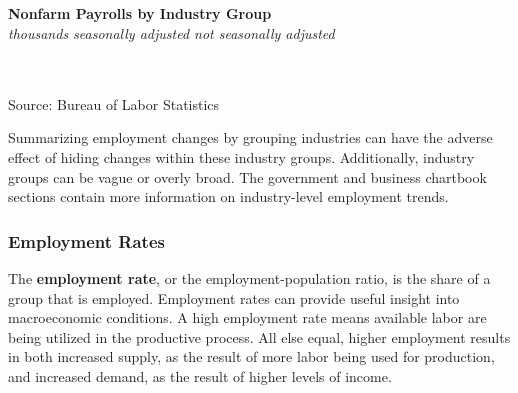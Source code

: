 \documentclass{report}
\newcommand{\tbllink}[1]{\href{https://raw.githubusercontent.com/bdecon/US-chartbook/master/chartbook/data/#1}{\faTable}}
\begin{document}
{\begin{minipage}{0.76\textwidth}

\end{minipage}
\vspace{2mm}

\begin{minipage}{0.83\textwidth}
\normalsize \textbf{Nonfarm Payrolls by Industry Group}\\
\footnotesize{\textit{thousands \hspace{37mm}seasonally adjusted \hspace{27mm} not seasonally adjusted}}\\
\vspace{-5mm}

\hspace*{-3mm} \noindent {} \setlength{\tabcolsep}{3.6pt} \color{black!90}
		{\renewcommand{\arraystretch}{1.55}
		 \begin{tabular}{p{45mm} R{12.8mm} R{10.8mm} R{10.6mm} R{10.6mm} 
		   | R{12.0mm} R{10.6mm}}
			  \hline
		\end{tabular}
		}	\\
		
\vspace{-2mm}
\footnotesize{Source: Bureau of Labor Statistics} \hfill \tbllink{ces_data.csv}
\end{minipage}
\vspace{3mm}

\begin{minipage}{0.76\textwidth}
\small Summarizing employment changes by grouping industries can have the adverse effect of hiding changes within these industry groups. Additionally, industry groups can be vague or overly broad. The government and business chartbook sections contain more information on industry-level employment trends. 
\end{minipage}
\newpage
\vspace*{-10mm}

\begin{minipage}{0.76\textwidth} 
\subsubsection*{Employment Rates} 
\vspace{-0.5mm}
\small The \textbf{employment rate}, or the employment-population ratio, is the share of a group that is employed. Employment rates can provide useful insight into macroeconomic conditions. A high employment rate means available labor are being utilized in the productive process. All else equal, higher employment results in both increased supply, as the result of more labor being used for production, and increased demand, as the result of higher levels of income.


\end{minipage}}
\end{document}
